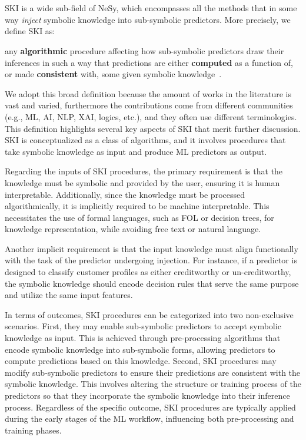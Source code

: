 \section[Symbolic knowledge injection]{}\label{sec:ski}
%
\Gls{SKI} is a wide sub-field of \gls{NeSy}, which encompasses all the methods that in some way \emph{inject} symbolic knowledge into sub-symbolic predictors.
%
More precisely, we define \gls{SKI} as:
%
\begin{definition}
    \label{def:ski}
    any \textbf{algorithmic} procedure affecting how sub-symbolic predictors draw their inferences in such a way that predictions are either \textbf{computed} as a function of, or made \textbf{consistent} with, some given symbolic knowledge~\cite{DBLP:journals/csur/CiattoSAMO24}.
\end{definition}
%
We adopt this broad definition because the amount of works in the literature is vast and varied, furthermore the contributions come from different communities (e.g., \gls{ML}, \gls{AI}, \gls{NLP}, \gls{XAI}, logics, etc.), and they often use different terminologies.
%
This definition highlights several key aspects of \gls{SKI} that merit further discussion.
%
\gls{SKI} is conceptualized as a class of algorithms, and it involves procedures that take symbolic knowledge as input and produce \gls{ML} predictors as output.

Regarding the inputs of \gls{SKI} procedures, the primary requirement is that the knowledge must be symbolic and provided by the user, ensuring it is human interpretable.
%
Additionally, since the knowledge must be processed algorithmically, it is implicitly required to be machine interpretable.
%
This necessitates the use of formal languages, such as \gls{FOL} or decision trees, for knowledge representation, while avoiding free text or natural language.

Another implicit requirement is that the input knowledge must align functionally with the task of the predictor undergoing injection.
%
For instance, if a predictor is designed to classify customer profiles as either creditworthy or un-creditworthy, the symbolic knowledge should encode decision rules that serve the same purpose and utilize the same input features.

In terms of outcomes, \gls{SKI} procedures can be categorized into two non-exclusive scenarios.
%
First, they may enable sub-symbolic predictors to accept symbolic knowledge as input.
%
This is achieved through pre-processing algorithms that encode symbolic knowledge into sub-symbolic forms, allowing predictors to compute predictions based on this knowledge.
%
Second, \gls{SKI} procedures may modify sub-symbolic predictors to ensure their predictions are consistent with the symbolic knowledge.
%
This involves altering the structure or training process of the predictors so that they incorporate the symbolic knowledge into their inference process.
%
Regardless of the specific outcome, \gls{SKI} procedures are typically applied during the early stages of the \gls{ML} workflow, influencing both pre-processing and training phases.

